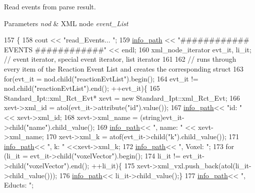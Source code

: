 Read events from parse result. 


\begin{DoxyParams}{Parameters}
{\em nod} & X\+M\+L node {\itshape event\+\_\+\+List} \\
\hline
\end{DoxyParams}

\begin{DoxyCode}
157                                                  \{
158     cout << \textcolor{stringliteral}{"read\_Events... "};
159     \hyperlink{classnw_1_1_standard___ipt_a7b8147e8b90f4adabb30e1b3fd8c40b8}{info\_path} << \textcolor{stringliteral}{"############ EVENTS ############"} << endl;
160     xml\_node\_iterator evt\_it, li\_it; \textcolor{comment}{// event iterator, special event iterator, list iterator}
161 
162 \textcolor{comment}{//  runs through every item of the Reaction Event List and creates the corresponding struct}
163     \textcolor{keywordflow}{for}(evt\_it = nod.child(\textcolor{stringliteral}{"reactionEvtList"}).begin();
164             evt\_it != nod.child(\textcolor{stringliteral}{"reactionEvtList"}).end(); ++evt\_it)\{
165         Standard\_Ipt::xml\_Rct\_Evt* xevt = \textcolor{keyword}{new} Standard\_Ipt::xml\_Rct\_Evt;
166         xevt->xml\_id = atol(evt\_it->attribute(\textcolor{stringliteral}{"id"}).value());
167         \hyperlink{classnw_1_1_standard___ipt_a7b8147e8b90f4adabb30e1b3fd8c40b8}{info\_path}<< \textcolor{stringliteral}{"id: "} << xevt->xml\_id;
168         xevt->xml\_name = (string)evt\_it->child(\textcolor{stringliteral}{"name"}).child\_value();
169         \hyperlink{classnw_1_1_standard___ipt_a7b8147e8b90f4adabb30e1b3fd8c40b8}{info\_path}<< \textcolor{stringliteral}{", name: "} << xevt->xml\_name;
170         xevt->xml\_k = atof(evt\_it->child(\textcolor{stringliteral}{"k"}).child\_value());
171         \hyperlink{classnw_1_1_standard___ipt_a7b8147e8b90f4adabb30e1b3fd8c40b8}{info\_path}<< \textcolor{stringliteral}{", k: "} <<xevt->xml\_k;
172         \hyperlink{classnw_1_1_standard___ipt_a7b8147e8b90f4adabb30e1b3fd8c40b8}{info\_path}<< \textcolor{stringliteral}{", Voxel: "};
173         \textcolor{keywordflow}{for} (li\_it = evt\_it->child(\textcolor{stringliteral}{"voxelVector"}).begin();
174                 li\_it != evt\_it->child(\textcolor{stringliteral}{"voxelVector"}).end(); ++li\_it)\{
175             xevt->xml\_vxl.push\_back(atol(li\_it->child\_value()));
176             \hyperlink{classnw_1_1_standard___ipt_a7b8147e8b90f4adabb30e1b3fd8c40b8}{info\_path}<< li\_it->child\_value();\}
177         \hyperlink{classnw_1_1_standard___ipt_a7b8147e8b90f4adabb30e1b3fd8c40b8}{info\_path}<< \textcolor{stringliteral}{", Educts: "};

\end{DoxyCode}
